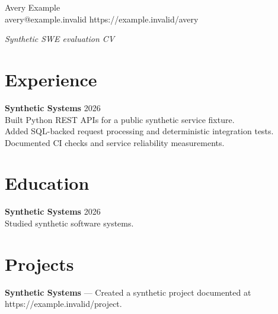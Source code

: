 \documentclass[10pt]{article}
\begin{document}
\begin{center}
{\Large Avery Example}\\
avery@example.invalid \quad https://example.invalid/avery
\end{center}
\textit{Synthetic SWE evaluation CV}\\
\section*{Experience}
\textbf{Synthetic Systems} \hfill 2026\\
Built Python REST APIs for a public synthetic service fixture.\\
Added SQL-backed request processing and deterministic integration tests.\\
Documented CI checks and service reliability measurements.
\section*{Education}
\textbf{Synthetic Systems} \hfill 2026\\
Studied synthetic software systems.
\section*{Projects}
\textbf{Synthetic Systems} --- Created a synthetic project documented at
https://example.invalid/project.
\end{document}
